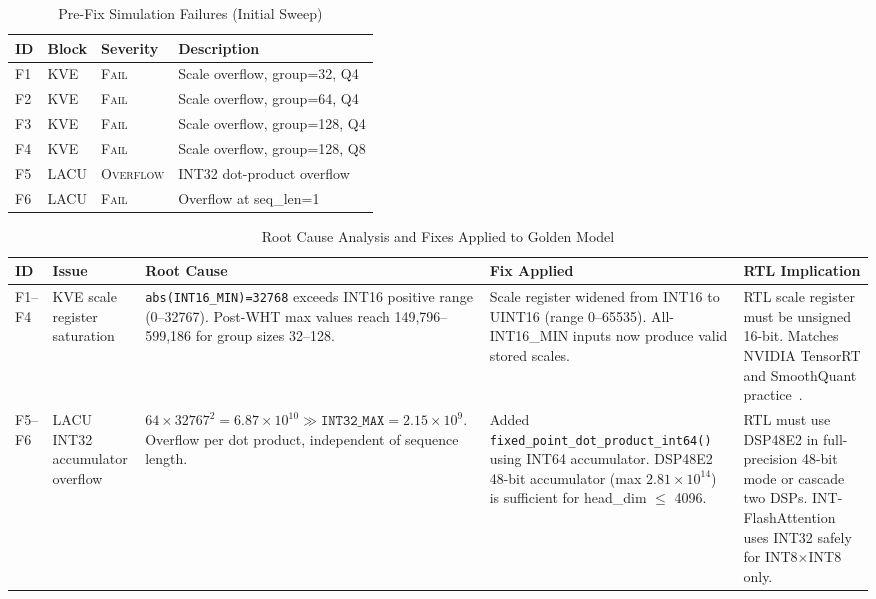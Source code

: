 \documentclass[conference]{IEEEtran}
\newcommand{\kve}{\textsc{KVE}}
\newcommand{\lacu}{\textsc{LACU}}
\begin{document}
\begin{table}[t]
\caption{Pre-Fix Simulation Failures (Initial Sweep)}
\label{tab:findings_before}
\centering
\begin{tabular}{llll}
\toprule
ID & Block & Severity & Description \\
\midrule
F1 & \kve & \textsc{Fail} & Scale overflow, group=32, Q4 \\
F2 & \kve & \textsc{Fail} & Scale overflow, group=64, Q4 \\
F3 & \kve & \textsc{Fail} & Scale overflow, group=128, Q4 \\
F4 & \kve & \textsc{Fail} & Scale overflow, group=128, Q8 \\
F5 & \lacu & \textsc{Overflow} & INT32 dot-product overflow \\
F6 & \lacu & \textsc{Fail} & Overflow at seq\_len=1 \\
\bottomrule
\end{tabular}
\end{table}

\begin{table}[t]
\caption{Root Cause Analysis and Fixes Applied to Golden Model}
\label{tab:root_cause}
\centering
\begin{tabular}{p{0.5cm}p{2.2cm}p{4.5cm}p{4.5cm}p{3.5cm}}
\toprule
ID & Issue & Root Cause & Fix Applied & RTL Implication \\
\midrule
F1--F4 &
KVE scale register saturation &
\texttt{abs(INT16\_MIN)=32768} exceeds INT16 positive range (0--32767). Post-WHT max values reach 149,796--599,186 for group sizes 32--128. &
Scale register widened from INT16 to UINT16 (range 0--65535). All-INT16\_MIN inputs now produce valid stored scales. &
RTL scale register must be unsigned 16-bit. Matches NVIDIA TensorRT and SmoothQuant practice~\cite{smoothquant2023}. \\[4pt]
F5--F6 &
LACU INT32 accumulator overflow &
$64 \times 32767^2 = 6.87{\times}10^{10} \gg \texttt{INT32\_MAX}{=}2.15{\times}10^9$. Overflow per dot product, independent of sequence length. &
Added \texttt{fixed\_point\_dot\_product\_int64()} using INT64 accumulator. DSP48E2 48-bit accumulator (max $2.81{\times}10^{14}$) is sufficient for head\_dim $\le$ 4096. &
RTL must use DSP48E2 in full-precision 48-bit mode or cascade two DSPs. INT-FlashAttention~\cite{intflashattention2024} uses INT32 safely for INT8$\times$INT8 only. \\
\bottomrule
\end{tabular}
\end{table}
\end{document}
